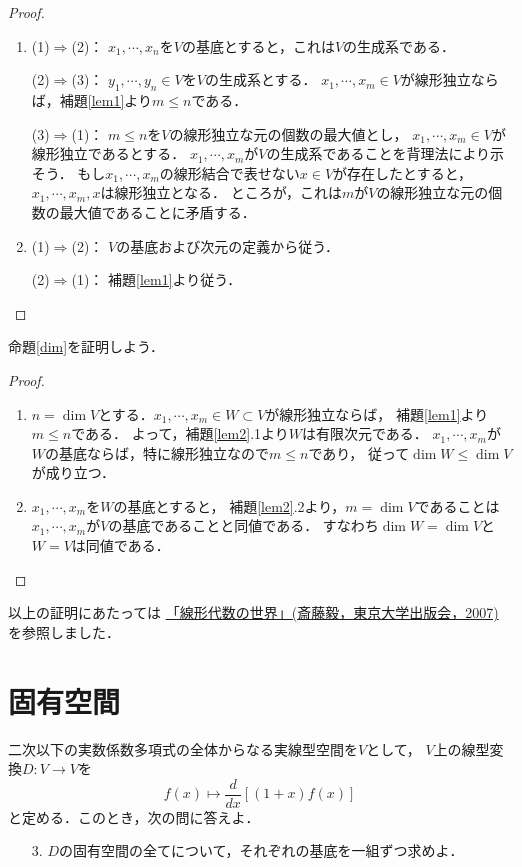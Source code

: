 \documentclass{jsarticle}
\theoremstyle{definition}
\begin{document}
\begin{proof}
\begin{enumerate}
\item(1)$\Rightarrow$(2)：
$x_1,\cdots,x_n$を$V$の基底とすると，これは$V$の生成系である．

(2)$\Rightarrow$(3)：
$y_1,\cdots,y_n\in V$を$V$の生成系とする．
$x_1,\cdots,x_m\in V$が線形独立ならば，補題\ref{lem1}より$m\leq n$である．

(3)$\Rightarrow$(1)：
$m\leq n$を$V$の線形独立な元の個数の最大値とし，
$x_1,\cdots,x_m\in V$が線形独立であるとする．
$x_1,\cdots,x_m$が$V$の生成系であることを背理法により示そう．
もし$x_1,\cdots,x_m$の線形結合で表せない$x\in V$が存在したとすると，
$x_1,\cdots,x_m,x$は線形独立となる．
ところが，これは$m$が$V$の線形独立な元の個数の最大値であることに矛盾する．
\item(1)$\Rightarrow$(2)：
$V$の基底および次元の定義から従う．

(2)$\Rightarrow$(1)：
補題\ref{lem1}より従う．
\end{enumerate}
\end{proof}

命題\ref{dim}を証明しよう．

\begin{proof}
\begin{enumerate}
\item$n=\dim{V}$とする．$x_1,\cdots,x_m\in W\subset V$が線形独立ならば，
補題\ref{lem1}より$m\leq n$である．
よって，補題\ref{lem2}.1より$W$は有限次元である．
$x_1,\cdots,x_m$が$W$の基底ならば，特に線形独立なので$m\leq n$であり，
従って$\dim{W}\leq\dim{V}$が成り立つ．
\item$x_1,\cdots,x_m$を$W$の基底とすると，
補題\ref{lem2}.2より，$m=\dim{V}$であることは$x_1,\cdots,x_m$が$V$の基底であることと同値である．
すなわち$\dim{W}=\dim{V}$と$W=V$は同値である．
\end{enumerate}
\end{proof}

以上の証明にあたっては
\href{http://www.utp.or.jp/book/b305671.html}{「線形代数の世界」(斎藤毅，東京大学出版会，2007)}
を参照しました．

\section{固有空間}

\begin{screen}
二次以下の実数係数多項式の全体からなる実線型空間を$V$として，
$V$上の線型変換$D\colon V\to V$を
\[ f(x)\mapsto\frac{d}{dx}[(1+x)f(x)] \]
と定める．このとき，次の問に答えよ．
\begin{itemize}
\item[3.]$D$の固有空間の全てについて，それぞれの基底を一組ずつ求めよ．
\end{itemize}
\end{screen}
\end{document}
